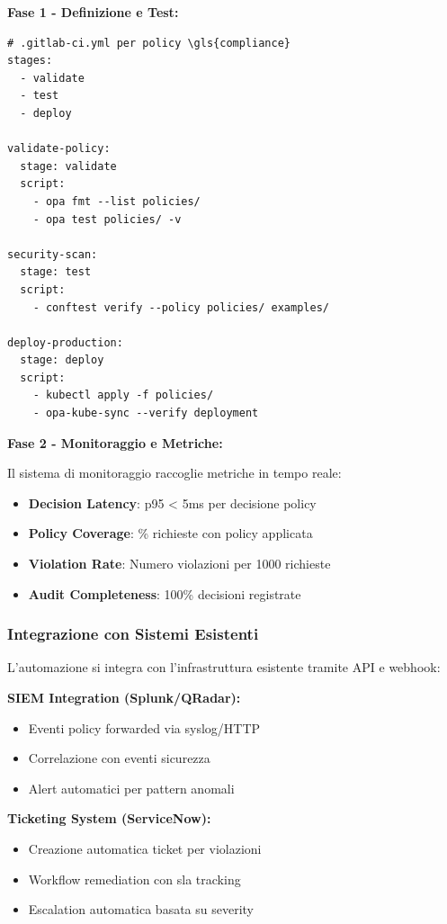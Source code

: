 \textbf{Fase 1 - Definizione e Test:}
\begin{lstlisting}[caption={Pipeline \gls{cicd} per Policy \gls{compliance}},label={lst:cicd_policy}]
# .gitlab-ci.yml per policy \gls{compliance}
stages:
  - validate
  - test
  - deploy

validate-policy:
  stage: validate
  script:
    - opa fmt --list policies/
    - opa test policies/ -v
    
security-scan:
  stage: test
  script:
    - conftest verify --policy policies/ examples/
    
deploy-production:
  stage: deploy
  script:
    - kubectl apply -f policies/
    - opa-kube-sync --verify deployment
\end{lstlisting}

\textbf{Fase 2 - Monitoraggio e Metriche:}

Il sistema di monitoraggio raccoglie metriche in tempo reale:
\begin{itemize}
    \item \textbf{Decision Latency}: p95 < 5ms per decisione policy
    \item \textbf{Policy Coverage}: \% richieste con policy applicata
    \item \textbf{Violation Rate}: Numero violazioni per 1000 richieste
    \item \textbf{Audit Completeness}: 100\% decisioni registrate
\end{itemize}

\subsubsection{\texorpdfstring{Integrazione con Sistemi Esistenti}{4.4.2.3 - Integrazione con Sistemi Esistenti}}

L'automazione si integra con l'infrastruttura esistente tramite API e webhook:

\textbf{SIEM Integration (Splunk/QRadar):}
\begin{itemize}
    \item Eventi policy forwarded via syslog/HTTP
    \item Correlazione con eventi sicurezza
    \item Alert automatici per pattern anomali
\end{itemize}

\textbf{Ticketing System (ServiceNow):}
\begin{itemize}
    \item Creazione automatica ticket per violazioni
    \item Workflow remediation con \gls{sla} tracking
    \item Escalation automatica basata su severity
\end{itemize}

